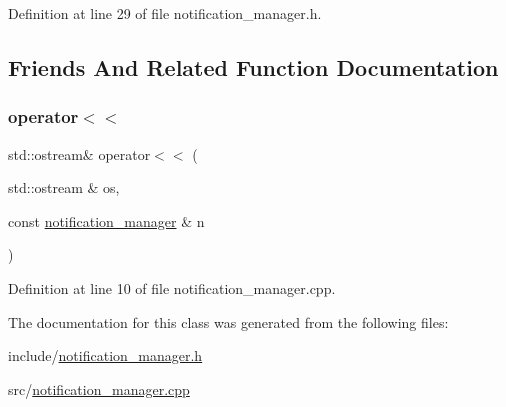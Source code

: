 Definition at line 29 of file notification\+\_\+manager.\+h.



\subsection{Friends And Related Function Documentation}
\mbox{\label{classbattle__ship_1_1notification__manager_ae88cf18d6c7447486803aa949db9b667}} 
\subsubsection{\texorpdfstring{operator$<$$<$}{operator<<}}
{\footnotesize\ttfamily std\+::ostream\& operator$<$$<$ (\begin{DoxyParamCaption}\item[{std\+::ostream \&}]{os,  }\item[{const \hyperlink{classbattle__ship_1_1notification__manager}{notification\+\_\+manager} \&}]{n }\end{DoxyParamCaption})\hspace{0.3cm}{\ttfamily [friend]}}



Definition at line 10 of file notification\+\_\+manager.\+cpp.



The documentation for this class was generated from the following files\+:\begin{DoxyCompactItemize}
\item 
include/\hyperlink{notification__manager_8h}{notification\+\_\+manager.\+h}\item 
src/\hyperlink{notification__manager_8cpp}{notification\+\_\+manager.\+cpp}\end{DoxyCompactItemize}
